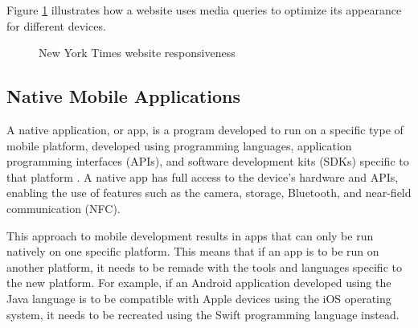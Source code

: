\documentclass[a4paper,12pt]{article}
\begin{document}
Figure \ref{fig:responsiveness} illustrates how a website uses media queries to optimize its appearance for different devices.

\begin{figure}[h]%
	\centering
	\quad
	\caption{New York Times website responsiveness}%
	\label{fig:responsiveness}%
\end{figure}

\subsection{Native Mobile Applications}
\label{Theory_nativeApps}
A native application, or app, is a program developed to run on a specific type of mobile platform, developed using programming languages, application programming interfaces (APIs), and software development kits (SDKs) specific to that platform \cite{crossplatform_taxonomy, mobile_web_apps_2013}. A native app has full access to the device’s hardware and APIs, enabling the use of features such as the camera, storage, Bluetooth, and near-field communication (NFC).

This approach to mobile development results in apps that can only be run natively on one specific platform. This means that if an app is to be run on another platform, it needs to be remade with the tools and languages specific to the new platform. For example, if an Android application developed using the Java language is to be compatible with Apple devices using the iOS operating system, it needs to be recreated using the Swift programming language instead.
\end{document}
